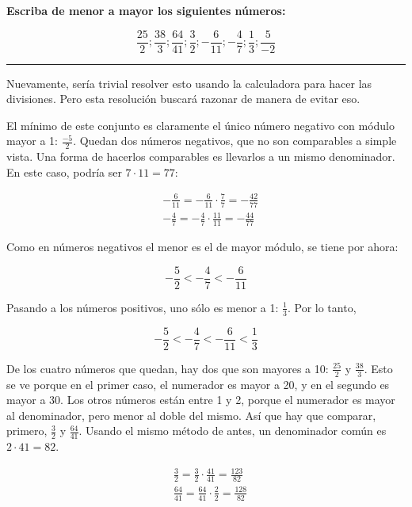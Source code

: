 \documentclass{article}
\begin{document}
\textbf{Escriba de menor a mayor los siguientes números:}

\begin{equation}
\frac{25}{2}; \frac{38}{3}; \frac{64}{41}; \frac{3}{2}; -\frac{6}{11}; -\frac{4}{7}; \frac{1}{3}; \frac{5}{-2}
\end{equation}

\hrule
\vspace{1em}

Nuevamente, sería trivial resolver esto usando la calculadora para hacer las divisiones. Pero esta resolución buscará razonar de manera de evitar eso.

El mínimo de este conjunto es claramente el único número negativo con módulo mayor a 1: $\frac{-5}{2}$. Quedan dos números negativos, que no son comparables a simple vista. Una forma de hacerlos comparables es llevarlos a un mismo denominador. En este caso, podría ser $7 \cdot 11 = 77$:

\begin{subequations} 
\begin{align}
& -\frac{6}{11} = -\frac{6}{11} \cdot \frac{7}{7} = -\frac{42}{77} \\
& -\frac{4}{7} = -\frac{4}{7} \cdot \frac{11}{11} = -\frac{44}{77}
\end{align}
\end{subequations}

Como en números negativos el menor es el de mayor módulo, se tiene por ahora:

\begin{equation}
-\frac{5}{2} < -\frac{4}{7} < -\frac{6}{11}
\end{equation}

Pasando a los números positivos, uno sólo es menor a 1: $\frac{1}{3}$. Por lo tanto,

\begin{equation}
-\frac{5}{2} < -\frac{4}{7} < -\frac{6}{11} < \frac{1}{3}
\end{equation}

De los cuatro números que quedan, hay dos que son mayores a 10: $\frac{25}{2}$ y $\frac{38}{3}$. Esto se ve porque en el primer caso, el numerador es mayor a 20, y en el segundo es mayor a 30. Los otros números están entre 1 y 2, porque el numerador es mayor al denominador, pero menor al doble del mismo. Así que hay que comparar, primero, $\frac{3}{2}$ y $\frac{64}{41}$. Usando el mismo método de antes, un denominador común es $2 \cdot 41 = 82$.

\begin{subequations} 
\begin{align}
& \frac{3}{2} = \frac{3}{2} \cdot \frac{41}{41} = \frac{123}{82} \\
& \frac{64}{41} = \frac{64}{41} \cdot \frac{2}{2} = \frac{128}{82}
\end{align}
\end{subequations}
\end{document}
